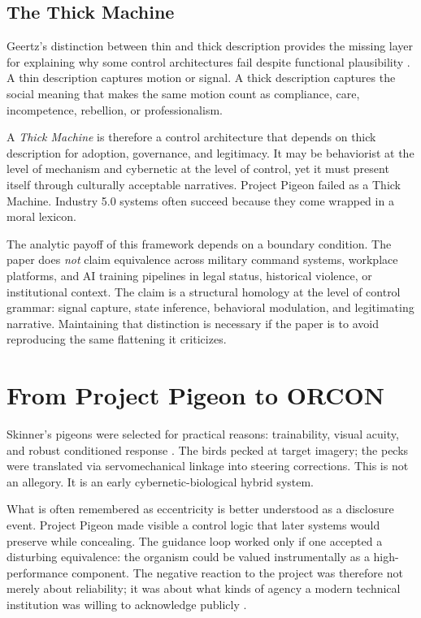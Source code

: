 \documentclass[runningheads]{llncs}
\begin{document}
\subsection{The Thick Machine}

Geertz's distinction between thin and thick description provides the missing layer for explaining why some control architectures fail despite functional plausibility \cite{geertz1973interpretation}. A thin description captures motion or signal. A thick description captures the social meaning that makes the same motion count as compliance, care, incompetence, rebellion, or professionalism.

A \emph{Thick Machine} is therefore a control architecture that depends on thick description for adoption, governance, and legitimacy. It may be behaviorist at the level of mechanism and cybernetic at the level of control, yet it must present itself through culturally acceptable narratives. Project Pigeon failed as a Thick Machine. Industry 5.0 systems often succeed because they come wrapped in a moral lexicon.

The analytic payoff of this framework depends on a boundary condition. The paper does \emph{not} claim equivalence across military command systems, workplace platforms, and AI training pipelines in legal status, historical violence, or institutional context. The claim is a structural homology at the level of control grammar: signal capture, state inference, behavioral modulation, and legitimating narrative. Maintaining that distinction is necessary if the paper is to avoid reproducing the same flattening it criticizes.

\section{From Project Pigeon to ORCON}

Skinner's pigeons were selected for practical reasons: trainability, visual acuity, and robust conditioned response \cite{skinner1960pigeons}. The birds pecked at target imagery; the pecks were translated via servomechanical linkage into steering corrections. This is not an allegory. It is an early cybernetic-biological hybrid system.

What is often remembered as eccentricity is better understood as a disclosure event. Project Pigeon made visible a control logic that later systems would preserve while concealing. The guidance loop worked only if one accepted a disturbing equivalence: the organism could be valued instrumentally as a high-performance component. The negative reaction to the project was therefore not merely about reliability; it was about what kinds of agency a modern technical institution was willing to acknowledge publicly \cite{capshew1993engineering,schultzfigueroa2019project,wlodarczyk2020beyond}.
\end{document}
